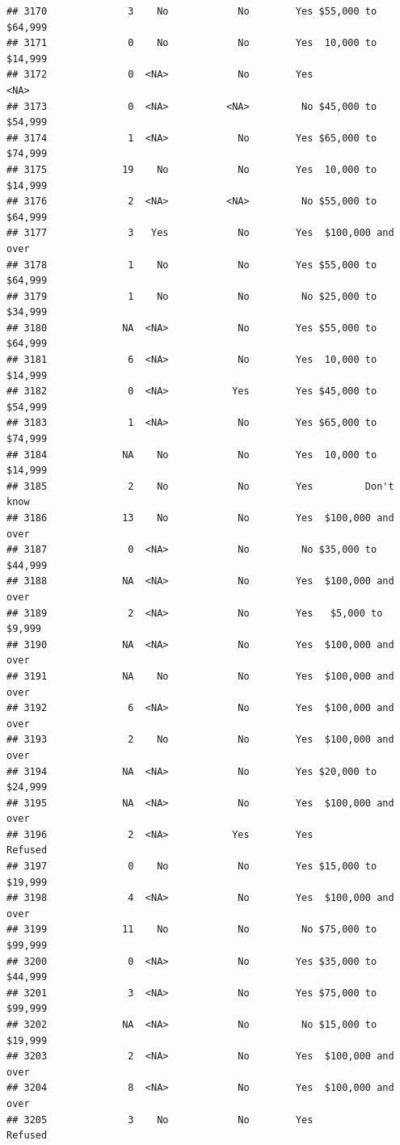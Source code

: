 \documentclass[man]{apa6}
\begin{document}
\begin{verbatim}
## 3170              3    No            No        Yes $55,000 to $64,999
## 3171              0    No            No        Yes  10,000 to $14,999
## 3172              0  <NA>            No        Yes               <NA>
## 3173              0  <NA>          <NA>         No $45,000 to $54,999
## 3174              1  <NA>            No        Yes $65,000 to $74,999
## 3175             19    No            No        Yes  10,000 to $14,999
## 3176              2  <NA>          <NA>         No $55,000 to $64,999
## 3177              3   Yes            No        Yes  $100,000 and over
## 3178              1    No            No        Yes $55,000 to $64,999
## 3179              1    No            No         No $25,000 to $34,999
## 3180             NA  <NA>            No        Yes $55,000 to $64,999
## 3181              6  <NA>            No        Yes  10,000 to $14,999
## 3182              0  <NA>           Yes        Yes $45,000 to $54,999
## 3183              1  <NA>            No        Yes $65,000 to $74,999
## 3184             NA    No            No        Yes  10,000 to $14,999
## 3185              2    No            No        Yes         Don't know
## 3186             13    No            No        Yes  $100,000 and over
## 3187              0  <NA>            No         No $35,000 to $44,999
## 3188             NA  <NA>            No        Yes  $100,000 and over
## 3189              2  <NA>            No        Yes   $5,000 to $9,999
## 3190             NA  <NA>            No        Yes  $100,000 and over
## 3191             NA    No            No        Yes  $100,000 and over
## 3192              6  <NA>            No        Yes  $100,000 and over
## 3193              2    No            No        Yes  $100,000 and over
## 3194             NA  <NA>            No        Yes $20,000 to $24,999
## 3195             NA  <NA>            No        Yes  $100,000 and over
## 3196              2  <NA>           Yes        Yes            Refused
## 3197              0    No            No        Yes $15,000 to $19,999
## 3198              4  <NA>            No        Yes  $100,000 and over
## 3199             11    No            No         No $75,000 to $99,999
## 3200              0  <NA>            No        Yes $35,000 to $44,999
## 3201              3  <NA>            No        Yes $75,000 to $99,999
## 3202             NA  <NA>            No         No $15,000 to $19,999
## 3203              2  <NA>            No        Yes  $100,000 and over
## 3204              8  <NA>            No        Yes  $100,000 and over
## 3205              3    No            No        Yes            Refused

\end{verbatim}
\end{document}
